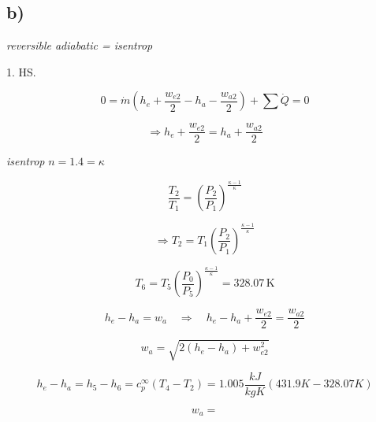 

\subsection*{b)}

\textit{reversible adiabatic = isentrop}

1. HS.

\[
0 = \dot{m} \left( h_e + \frac{w_{e2}}{2} - h_a - \frac{w_{a2}}{2} \right) + \sum \dot{Q} = 0
\]

\[
\Rightarrow h_e + \frac{w_{e2}}{2} = h_a + \frac{w_{a2}}{2}
\]

\textit{isentrop} \( n = 1.4 = \kappa \)

\[
\frac{T_2}{T_1} = \left( \frac{P_2}{P_1} \right)^{\frac{\kappa - 1}{\kappa}}
\]

\[
\Rightarrow T_2 = T_1 \left( \frac{P_2}{P_1} \right)^{\frac{\kappa - 1}{\kappa}}
\]

\[
T_6 = T_5 \left( \frac{P_0}{P_5} \right)^{\frac{\kappa - 1}{\kappa}} = 328.07 \, \text{K}
\]

\[
h_e - h_a = w_a \quad \Rightarrow \quad h_e - h_a + \frac{w_{e2}}{2} = \frac{w_{a2}}{2}
\]

\[
w_a = \sqrt{2 (h_e - h_a) + w_{e2}^2}
\]

\[
h_e - h_a = h_5 - h_6 = c_p^{\infty} (T_4 - T_2) = 1.005 \frac{kJ}{kgK} (431.9K - 328.07K)
\]

\[
w_a =
\]